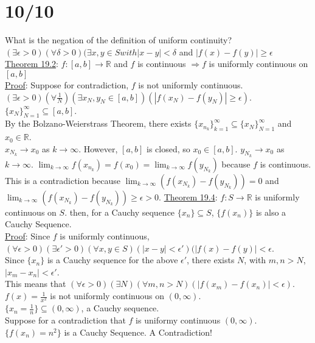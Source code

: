 \documentclass[11pt]{article}
\begin{document}
\section*{10/10}
	What is the negation of the definition of uniform continuity?\\
	$(\exists \epsilon > 0)(\forall \delta > 0)(\exists x,y \in S with |x-y| <
	\delta$ and $|f(x) - f(y)| \ge \epsilon$\\
	\underline{Theorem 19.2}: $f:[a,b] \rightarrow \mathbb{R}$ and 
	$f$ is continuous $\Rightarrow f$ is uniformly continuous on $[a,b]$\\
	\underline{Proof}: Suppose for contradiction, $f$ is not uniformly 
	continuous. $(\exists \epsilon > 0)(\forall \frac{1}{N})(\exists x_N,y_N 
	\in [a,b])(|f(x_N) - f(y_N)| \ge \epsilon)$.\\
	$\{ x_N \}_{N=1}^{\infty} \subseteq [a,b]$. \\
	By the Bolzano-Weierstrass Theorem, there exists $\{ x_{n_k} \}_{k=1}^
	{\infty} \subseteq \{x_N\}_{N=1}^{\infty}$ and $x_0 \in \mathbb{R}$.\\
	$x_{N_k} \to x_0$ as $k \to \infty$. However, $[a,b]$ is closed, so 
	$x_0 \in [a,b]$. $y_{N_k} \to x_0$ as $k \to \infty$. $\lim_{k \to \infty}
	{f(x_{n_k})} = f(x_0) = \lim_{k \to \infty}{f(y_{N_k})}$ because $f$ is
	continuous.\\
	This is a contradiction because $\lim_{k \to \infty}{(f(x_{N_k}) - 
	f(y_{N_k}))} = 0$ and $\lim_{k \to \infty}{(f(x_{N_k}) - 
	f(y_{N_k}))} \ge \epsilon > 0$.
	\underline{Theorem 19.4}: $f: S \to \mathbb{R}$ is uniformly continuous on
	$S$. then, for a Cauchy sequence $\{ x_n \} \subseteq S$, $\{f(x_n)\}$ is
	also a Cauchy Sequence. \\
	\underline{Proof}: Since $f$ is uniformly continuous, $(\forall \epsilon
	> 0)(\exists \epsilon' > 0)(\forall x,y \in S)(|x - y| < \epsilon')(
	|f(x) - f(y)| < \epsilon$.\\
	Since $\{ x_n \}$ is a Cauchy sequence for the above $\epsilon'$, there 
	exists $N$,  with $m,n > N$, $|x_m - x_n| < \epsilon'$.\\
	This means that $(\forall \epsilon > 0)(\exists N)(\forall m,n > N)(|f(x_m)
	- f(x_n)| < \epsilon)$.\\
	$f(x) = \frac{1}{x^2}$ is not uniformly continuous on $(0, \infty)$.\\
	$\{ x_n = \frac{1}{n} \} \subseteq (0, \infty)$, a Cauchy sequence.\\
	Suppose for a contradiction that $f$ is uniformy continuous $(0, \infty)$.\\
	$\{ f(x_n) = n^2 \}$ is a Cauchy Sequence. A Contradiction!
\end{document}
